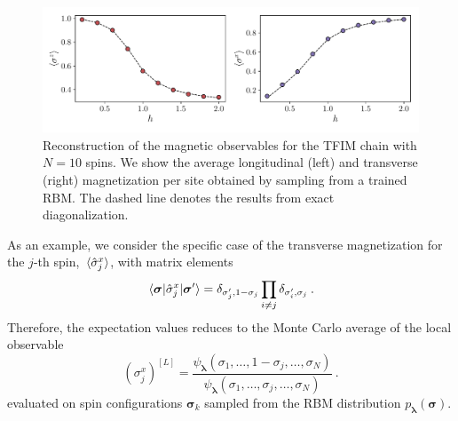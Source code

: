 \documentclass[submission, Phys, hidelnks]{SciPost}
\begin{document}
\begin{figure}[t]
    \centering{}
    \includegraphics[width=\columnwidth, trim={0 15 0 0}, clip]{obs.pdf}
    \caption{
        Reconstruction of the magnetic observables for the TFIM chain with
        $N=10$ spins. We show the average longitudinal (left) and transverse
        (right) magnetization per site obtained by sampling from a trained RBM.\@
        The dashed line denotes the results from exact diagonalization.
    }\label{tfim_magn}
\end{figure}

As an example, we consider the specific case of the transverse magnetization
for the $j$-th spin, $\ev*{\hat{\sigma}^x_j}$, with matrix elements
\begin{equation}
    \mel{\bm{\sigma}}{\hat{\sigma}^x_j}{\bm{\sigma}^{\prime}}=\delta_{\sigma_j^\prime,1-\sigma_j}\prod_{i\ne j}\delta_{\sigma_i^\prime,\sigma_j}\:.
\end{equation}
Therefore, the expectation values reduces to the Monte Carlo average of the
local observable
\begin{equation}
    {(\sigma^x_j)}^{[L]}=\frac{\psi_{\bm{\lambda}}(\sigma_1,\dots,1-\sigma_j,\dots,\sigma_N)}
    {\psi_{\bm{\lambda}}(\sigma_1,\dots,\sigma_j,\dots,\sigma_N)}
\:.
\end{equation}
evaluated on spin configurations $\bm{\sigma}_k$ sampled from the RBM
distribution $p_{\bm{\lambda}}(\bm{\sigma})$.
\end{document}
